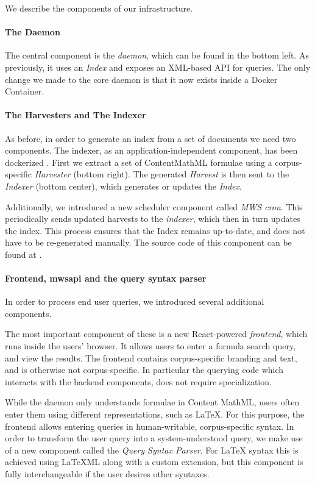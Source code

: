 We describe the components of our infrastructure. 

\paragraph{The \MWS Daemon}
The central component is the \textit{\MWS daemon}, which can be found in the bottom left. 
As previously, it uses an \textit{Index} and exposes an XML-based API for queries. 
The only change we made to the core daemon is that it now exists inside a Docker Container. 

\paragraph{The Harvesters and The Indexer}
As before, in order to generate an index from a set of documents we need two components. 
The indexer, as an application-independent component, has been dockerized . 
First we extract a set of ContentMathML formulae using a corpus-specific \textit{Harvester} (bottom right). 
The generated \textit{Harvest} is then sent to the \textit{Indexer} (bottom center), which generates or updates the \textit{Index}. 

Additionally, we introduced a new scheduler component called \textit{MWS cron}. 
This periodically sends updated harvests to the \textit{indexer}, which then in turn updates the index. 
This process ensures that the Index remains up-to-date, and does not have to be re-generated manually. 
The source code of this component can be found at . 

\paragraph{Frontend, mwsapi and the query syntax parser}

In order to process end user queries, we introduced several additional components.

The most important component of these is a new React-powered \textit{frontend}, which runs inside the users' browser. 
It allows users to enter a formula search query, and view the results. 
The frontend contains corpus-specific branding and text, and is otherwise not corpus-specific. 
In particular the querying code which interacts with the backend components, does not require specialization. 

While the \MWS daemon only understands formulae in Content MathML, users often enter them using different representations, such as \LaTeX. 
For this purpose, the frontend allows entering queries in human-writable, corpus-specific syntax. 
In order to transform the user query into a system-understood query, we make use of a new component called the \textit{Query Syntax Parser}. 
For {\LaTeX} syntax this is achieved using {\LaTeX}ML along with a custom \MWS extension, but this component is fully interchangeable if the user desires other syntaxes. 

